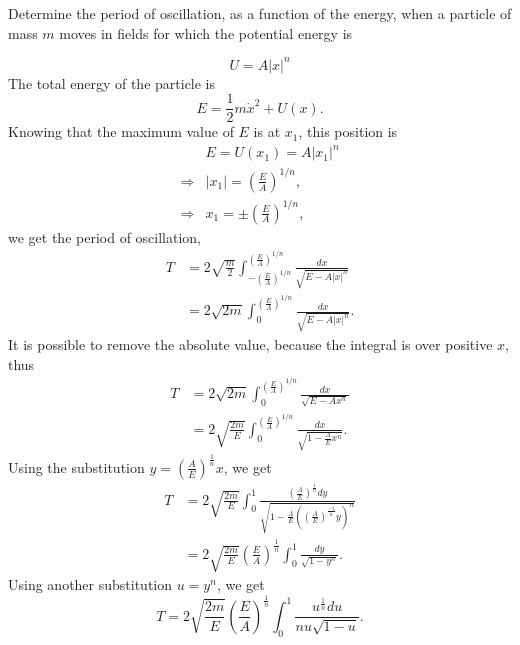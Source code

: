 \begin{problem}
{
Determine the period of oscillation, as a function of the energy, when a particle of mass $m$ moves in fields for which the potential energy is
}{}{}
\end{problem}
\begin{subproblem}
{
\begin{equation*}
    U = A|x|^n
\end{equation*}
}
{
The total energy of the particle is
\begin{equation*}
    E = \frac{1}{2}m\Dot{x}^2 + U(x).
\end{equation*}
Knowing that the maximum value of $E$ is at $x_1$, this position is
\begin{align*}
    &E = U(x_1) = A|x_1|^n \\
    \Rightarrow &|x_1| = \left( \frac{E}{A} \right)^{1/n}, \\
     \Rightarrow &x_1 = \pm \left( \frac{E}{A} \right)^{1/n},
\end{align*}
we get the period of oscillation,
\begin{align*}
    T &= 2\sqrt{\frac{m}{2}} \int_{-\left( \frac{E}{A} \right)^{1/n}}^{\left( \frac{E}{A}\right)^{1/n} }\frac{dx}{\sqrt{E-A|x|^n}} \\
    &= 2\sqrt{2m} \int_0^{\left( \frac{E}{A}\right)^{1/n} }\frac{dx}{\sqrt{E-A|x|^n}} .
\end{align*}
It is possible to remove the absolute value, because the integral is over positive $x$, thus
\begin{align*}
    T &= 2\sqrt{2m} \int_0^{\left( \frac{E}{A}\right)^{1/n} }\frac{dx}{\sqrt{E-Ax^n}} \\
    &= 2\sqrt{\frac{2m}{E}} \int_0^{\left( \frac{E}{A}\right)^{1/n} }\frac{dx}{\sqrt{1-\frac{A}{E}x^n}}.
\end{align*}
Using the substitution $y = \left(\frac{A}{E}\right)^{\frac{1}{n}}x$, we get
\begin{align*}
    T &= 2\sqrt{\frac{2m}{E}} \int_0^1 \frac{\left(\frac{A}{E}\right)^{\frac{1}{n}}dy}{\sqrt{1-\frac{A}{E}\left(\left(\frac{A}{E}\right)^{\frac{-1}{n}}y\right)^n}} \\
    &= 2\sqrt{\frac{2m}{E}} \left(\frac{E}{A}\right)^{\frac{1}{n}} \int_0^1 \frac{dy}{\sqrt{1-y^n}} .
\end{align*}
Using another substitution $u = y^n$, we get
\begin{equation*}
    T = 2\sqrt{\frac{2m}{E}} \left(\frac{E}{A}\right)^{\frac{1}{n}} \int_0^1 \frac{u^{\frac{1}{n}}du}{nu\sqrt{1-u}} .

\end{equation*}}
\end{subproblem}
